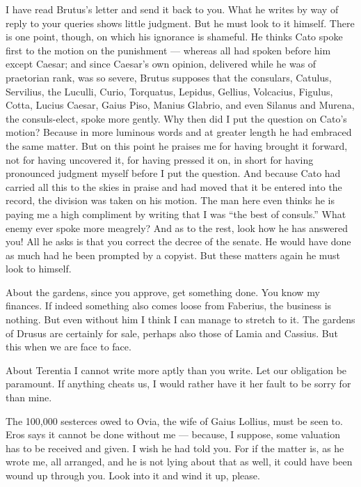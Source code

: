 

 I have read Brutus's letter and send it back to you. What he writes by way of reply to your queries shows little judgment. But he must look to it himself. There is one point, though, on which his ignorance is shameful. He thinks Cato spoke first to the motion on the punishment --- whereas all had spoken before him except Caesar; and since Caesar's own opinion, delivered while he was of praetorian rank, was so severe, Brutus supposes that the consulars, Catulus, Servilius, the Luculli, Curio, Torquatus, Lepidus, Gellius, Volcacius, Figulus, Cotta, Lucius Caesar, Gaius Piso, Manius Glabrio, and even Silanus and Murena, the consuls-elect, spoke more gently. Why then did I put the question on Cato's motion? Because in more luminous words and at greater length he had embraced the same matter. But on this point he praises me for having brought it forward, not for having uncovered it, for having pressed it on, in short for having pronounced judgment myself before I put the question. And because Cato had carried all this to the skies in praise and had moved that it be entered into the record, the division was taken on his motion. The man here even thinks he is paying me a high compliment by writing that I was ``the best of consuls.'' What enemy ever spoke more meagrely? And as to the rest, look how he has answered you! All he asks is that you correct the decree of the senate. He would have done as much had he been prompted by a copyist. But these matters again he must look to himself.

 About the gardens, since you approve, get something done. You know my finances. If indeed something also comes loose from Faberius, the business is nothing. But even without him I think I can manage to stretch to it. The gardens of Drusus are certainly for sale, perhaps also those of Lamia and Cassius. But this when we are face to face.

 About Terentia I cannot write more aptly than you write. Let our obligation be paramount. If anything cheats us, I would rather have it her fault to be sorry for than mine.

 The 100,000 sesterces owed to Ovia, the wife of Gaius Lollius, must be seen to. Eros says it cannot be done without me --- because, I suppose, some valuation has to be received and given. I wish he had told you. For if the matter is, as he wrote me, all arranged, and he is not lying about that as well, it could have been wound up through you. Look into it and wind it up, please.

